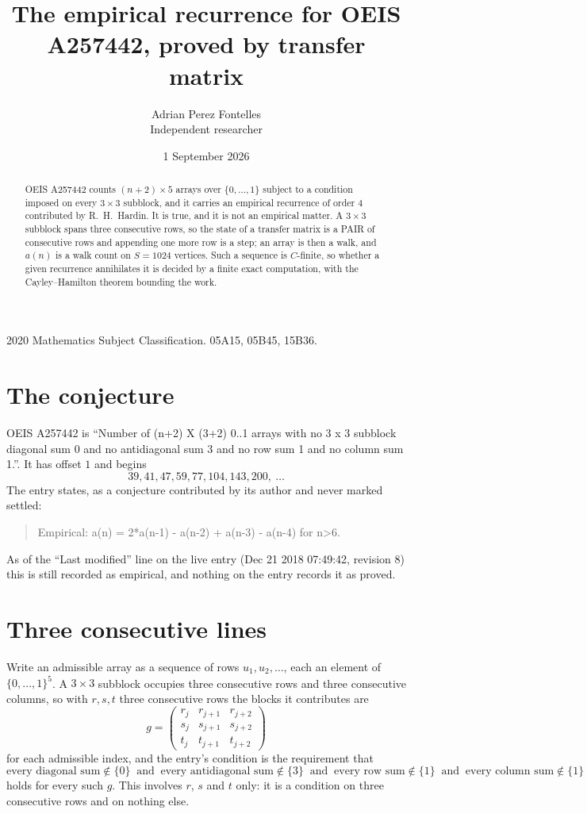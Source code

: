 \documentclass[11pt,a4paper]{article}
\title{The empirical recurrence for OEIS A257442, proved by transfer matrix}
\author{Adrian Perez Fontelles\\ \small Independent researcher}
\date{1 September 2026}
\theoremstyle{plain}
\theoremstyle{definition}
\begin{document}
\maketitle

\begin{abstract}
OEIS A257442 counts $(n+2)\times5$ arrays over $\{0,\dots,1\}$ subject to a condition imposed on
every $3\times3$ subblock, and it carries an empirical recurrence of order $4$
contributed by R.~H.~Hardin. It is true, and it is not an empirical matter. A $3\times3$
subblock spans three consecutive rows, so the state of a transfer matrix is a PAIR of
consecutive rows and appending one more row is a step; an array is then a walk, and
$a(n)$ is a walk count on $S=1024$ vertices. Such a sequence is $C$-finite, so whether a given
recurrence annihilates it is decided by a finite exact computation, with the Cayley--Hamilton
theorem bounding the work.
\end{abstract}

\noindent\small 2020 Mathematics Subject Classification. 05A15, 05B45, 15B36.\normalsize

\section{The conjecture}

OEIS A257442 is ``Number of (n+2) X (3+2) 0..1 arrays with no 3 x 3 subblock diagonal sum 0 and no antidiagonal sum 3 and no row sum 1 and no column sum 1.''. It has offset $1$ and begins
\[
39, 41, 47, 59, 77, 104, 143, 200,\ \dots
\]
The entry states, as a conjecture contributed by its author and never marked settled:
\begin{quote}
Empirical: a(n) = 2*a(n-1) - a(n-2) + a(n-3) - a(n-4) for n>6.
\end{quote}
As of the ``Last modified'' line on the live entry (Dec 21 2018 07:49:42, revision 8) this is still
recorded as empirical, and nothing on the entry records it as proved.

\section{Three consecutive lines}

Write an admissible array as a sequence of rows $u_1,u_2,\dots$, each an element of
$\{0,\dots,1\}^{5}$. A $3\times3$ subblock occupies three consecutive rows and
three consecutive columns, so with $r,s,t$ three consecutive rows the blocks it
contributes are
\[
g=\begin{pmatrix}r_j&r_{j+1}&r_{j+2}\\ s_j&s_{j+1}&s_{j+2}\\ t_j&t_{j+1}&t_{j+2}\end{pmatrix}
\]
for each admissible index, and the entry's condition is the requirement that
\[
\text{every diagonal sum} \notin \{0\}\ \text{ and }\ \text{every antidiagonal sum} \notin \{3\}\ \text{ and }\ \text{every row sum} \notin \{1\}\ \text{ and }\ \text{every column sum} \notin \{1\}
\]
holds for every such $g$. This involves $r$, $s$ and $t$ only: it is a condition on
three consecutive rows and on nothing else.
\end{document}

